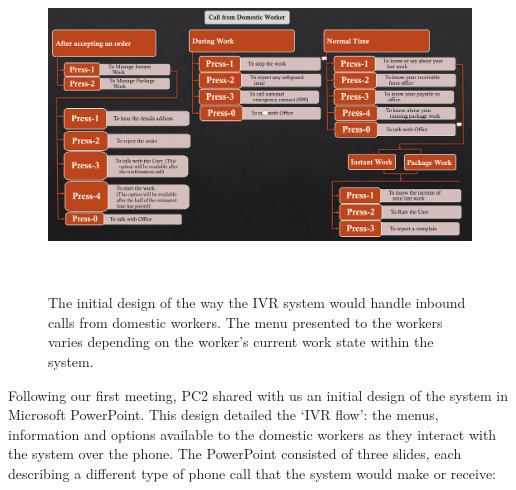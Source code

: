 \begin{figure}
  \centering
  \includegraphics[width=\columnwidth]{images/ivr_01_inbound.png}
  \caption{The initial design of the way the IVR system would handle inbound calls from domestic workers. The menu presented to the workers varies depending on the worker's current work state within the system.}~\label{fig:InboundCalls}
\end{figure}

Following our first meeting, PC2 shared with us an initial design of the system in Microsoft PowerPoint. This design detailed the `IVR flow': the menus, information and options available to the domestic workers as they interact with the system over the phone. The PowerPoint consisted of three slides, each describing a different type of phone call that the system would make or receive:

